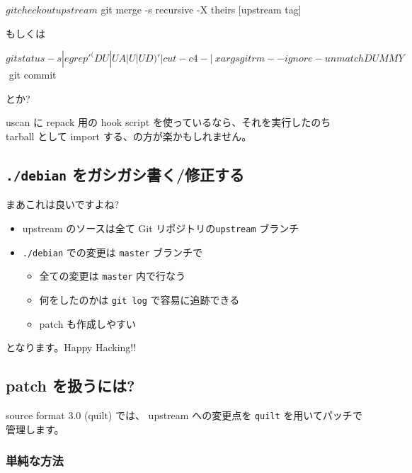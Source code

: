 \documentclass[mingoth,a4paper]{jsarticle}
\begin{document}
\begin{commandline}
$ git checkout upstream
$ git merge -s recursive -X theirs [upstream tag]
\end{commandline}

もしくは

\begin{commandline}
$ git status -s | egrep '^(DU|UA| U|UD)' | cut -c4- | \
    xargs git rm --ignore-unmatch DUMMY$$
$ git commit
\end{commandline}

とか?

uscan に repack 用の hook script を使っているなら、それを実行したのち
tarball として import する、の方が楽かもしれません。


\subsection*{\texttt{./debian} をガシガシ書く/修正する}

まあこれは良いですよね?

\begin{itemize}
\item upstream のソースは全て Git リポジトリの\texttt{upstream} ブランチ
\item \texttt{./debian} での変更は \texttt{master} ブランチで
  \begin{itemize}
  \item 全ての変更は \texttt{master} 内で行なう
  \item 何をしたのかは \texttt{git log} で容易に追跡できる
  \item patch も作成しやすい
  \end{itemize}
\end{itemize}
となります。Happy Hacking!!

\subsection*{patch を扱うには?}

source format 3.0 (quilt) では、
upstream への変更点を {\tt{quilt}} を用いてパッチで管理します。

\subsubsection*{単純な方法}
\end{document}
